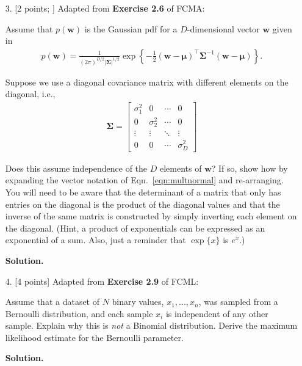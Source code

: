 \documentclass[10pt]{article}
\begin{document}
\begin{itemize}
{\bf Solution.}


\item[3.] [2 points; \boldred{Required only for Graduates}]
Adapted from {\bf Exercise 2.6} of FCMA:

Assume that $p(\mathbf{w})$ is the Gaussian pdf for a $D$-dimensional vector $\mathbf{w}$ given in
\begin{eqnarray}
p(\mathbf{w}) = \frac{1}{(2 \pi)^{D/2} | \mathbf{\Sigma} |^{1/2}} \exp \left\{ -\frac{1}{2} (\mathbf{w} - \mathbf{\mu})^\top \mathbf{\Sigma}^{-1} (\mathbf{w} - \mathbf{\mu}) \right\} . \label{eqn:multnormal}
\end{eqnarray}

Suppose we use a diagonal covariance matrix with different elements on the diagonal, i.e.,
\begin{eqnarray*}
\mathbf{\Sigma} = 
\begin{bmatrix}
\sigma_1^2 & 0 & \cdots & 0 \\
0 & \sigma_2^2 & \cdots & 0 \\
\vdots & \vdots & \ddots & \vdots \\
0 & 0 & \cdots & \sigma_D^2
\end{bmatrix}
\end{eqnarray*}

Does this assume independence of the $D$ elements of $\mathbf{w}$?  If so, show how by expanding the vector notation of Eqn.~\ref{eqn:multnormal} and re-arranging.  You will need to be aware that the determinant of a matrix that only has entries on the diagonal is the product of the diagonal values and that the inverse of the same matrix is constructed by simply inverting each element on the diagonal.  (Hint, a product of exponentials can be expressed as an exponential of a sum.  Also, just a reminder that $\exp\{x\}$ is $e^x$.)

{\bf Solution.}



\item[4.] [4 points]
Adapted from {\bf Exercise 2.9} of FCML:

Assume that a dataset of $N$ binary values, $x_1, ..., x_n$, was sampled from a Bernoulli distribution, and each sample $x_i$ is independent of any other sample.  Explain why this is {\em not} a Binomial distribution.  Derive the maximum likelihood estimate for the Bernoulli parameter.

{\bf Solution.} 




\end{itemize}
\end{document}
